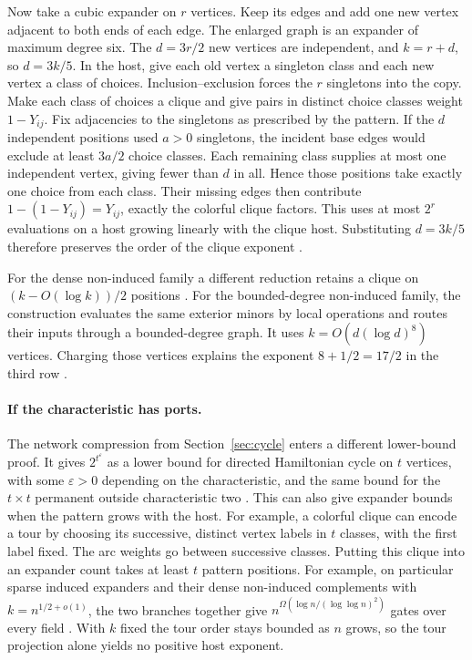 \documentclass[11pt]{article}
\theoremstyle{definition}
\begin{document}
Now take a cubic expander on \(r\) vertices. Keep its edges and add
one new vertex adjacent to both ends of each edge. The enlarged graph
is an expander of maximum degree six. The \(d=3r/2\) new vertices
are independent, and \(k=r+d\), so \(d=3k/5\). In the host, give
each old vertex a singleton class and each new vertex a class of
choices. Inclusion--exclusion forces the \(r\) singletons into the
copy. Make each class of choices a clique and give pairs in distinct
choice classes weight \(1-Y_{ij}\). Fix adjacencies to the singletons
as prescribed by the pattern. If the \(d\) independent positions used
\(a>0\) singletons, the incident base edges would exclude at least
\(3a/2\) choice classes. Each remaining class supplies at most one
independent vertex, giving fewer than \(d\) in all. Hence those
positions take exactly one choice from each class. Their
missing edges then contribute \(1-(1-Y_{ij})=Y_{ij}\), exactly the
colorful clique factors. This uses at most \(2^r\) evaluations on a
host growing linearly with the clique host. Substituting \(d=3k/5\)
therefore preserves the order of the clique exponent \cite{sparse-patterns}.

For the dense non-induced family a different reduction retains a clique
on \((k-O(\log k))/2\) positions \cite{pairtables}. For the bounded-degree
non-induced family, the construction evaluates the same exterior minors
by local operations and routes their inputs through a bounded-degree
graph. It uses \(k=O(d(\log d)^8)\) vertices. Charging those vertices
explains the exponent \(8+1/2=17/2\) in the third row \cite{sparserouting}.

\paragraph{If the characteristic has ports.}
The network compression from Section~\ref{sec:cycle} enters a different
lower-bound proof. It gives \(2^{t^{\varepsilon}}\) as a lower bound
for directed Hamiltonian cycle on \(t\) vertices, with some
\(\varepsilon>0\) depending on the characteristic, and the same bound
for the \(t\times t\) permanent outside characteristic two \cite{circuits}.
This can also give expander bounds when the pattern grows with the
host. For example, a colorful clique can encode a tour by choosing
its successive, distinct vertex labels in \(t\) classes, with the first
label fixed. The arc weights go between successive classes. Putting
this clique into an expander count takes at least \(t\) pattern
positions. For example, on particular sparse induced expanders and
their dense non-induced complements with \(k=n^{1/2+o(1)}\), the two
branches together give \(n^{\Omega(\log n/(\log\log n)^2)}\) gates
over every field \cite{pairtables}. With \(k\) fixed the tour order
stays bounded as \(n\) grows, so the tour projection alone yields no
positive host exponent.
\end{document}
